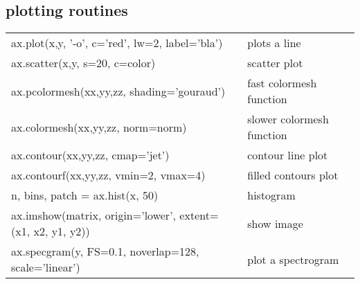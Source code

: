 \documentclass[10pt, a4paper, twocolumn]{article}
\begin{document}
\subsection*{plotting routines}
\begin{tabular}{ p{} p{} }
    ax.plot(x,y, '-o', c='red', lw=2, label='bla') & plots a line\\
                    ax.scatter(x,y, s=20, c=color) & scatter plot\\
       ax.pcolormesh(xx,yy,zz, shading='gouraud') & fast colormesh function\\
                ax.colormesh(xx,yy,zz, norm=norm) & slower colormesh function\\
                 ax.contour(xx,yy,zz, cmap='jet') & contour line plot\\
     ax.contourf(xx,yy,zz, vmin=2, vmax=4) & filled contours plot\\
     n, bins, patch = ax.hist(x, 50) & histogram\\
     ax.imshow(matrix, origin='lower', extent=(x1, x2, y1, y2)) & show image\\
     ax.specgram(y, FS=0.1, noverlap=128, scale='linear') & plot a spectrogram\\
\end{tabular}
\end{document}
